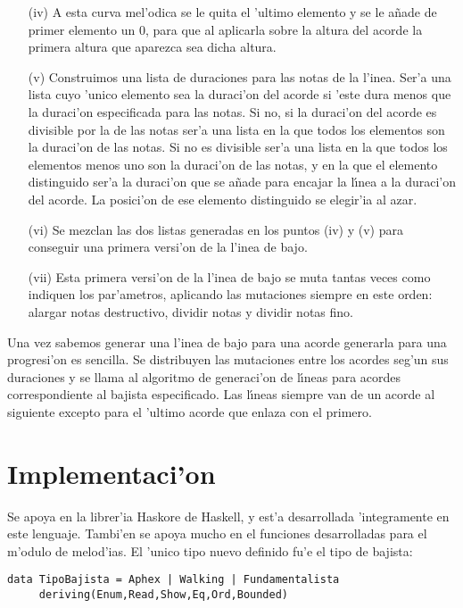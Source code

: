 \begin{enumerate}
\begin{enumerate}
		\item[(iv)] A esta curva mel'odica se le quita el 'ultimo elemento y se le a\~nade de primer elemento un 0, para que al aplicarla sobre la altura del acorde la primera altura que aparezca sea dicha altura.
		\item[(v)] Construimos una lista de duraciones para las notas de la l'inea. Ser'a una lista cuyo 'unico elemento sea la duraci'on del acorde si 'este dura menos que la duraci'on especificada para las notas. Si no, si la duraci'on del acorde es divisible por la de las notas ser'a una lista en la que todos los elementos son la duraci'on de las notas. Si no es divisible ser'a una lista en la que todos los elementos menos uno son la duraci'on de las notas, y en la que el elemento distinguido ser'a la duraci'on que se a\~nade para encajar la l\'\i nea a la duraci'on del acorde. La posici'on de ese elemento distinguido se elegir'ia al azar.
 		\item[(vi)] Se mezclan las dos listas generadas en los puntos (iv) y (v) para conseguir una primera versi'on de la l'inea de bajo.
		\item[(vii)] Esta primera versi'on de la l'inea de bajo se muta tantas veces como indiquen los par'ametros, aplicando las mutaciones siempre en este orden: alargar notas destructivo,  dividir notas y dividir notas fino.
		\end{enumerate}
	\end{enumerate}
Una vez sabemos generar una l'inea de bajo para una acorde generarla para una progresi'on es sencilla. Se distribuyen las mutaciones entre los acordes seg'un sus duraciones y se llama al algoritmo de generaci'on de l\'\i neas para acordes correspondiente al bajista especificado. Las l\'\i neas siempre van de un acorde al siguiente excepto para el 'ultimo acorde que enlaza con el primero.

\section{Implementaci'on}
Se apoya en la librer'ia Haskore de Haskell, y est'a desarrollada 'integramente en este lenguaje. Tambi'en se apoya mucho en el funciones desarrolladas para el m'odulo de melod'ias.
\newline\newline
El 'unico tipo nuevo definido fu'e el tipo de bajista:
	\begin{verbatim}
data TipoBajista = Aphex | Walking | Fundamentalista
     deriving(Enum,Read,Show,Eq,Ord,Bounded)
	\end{verbatim}

